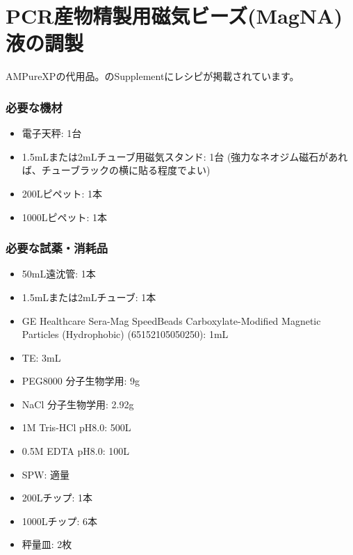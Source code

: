 \documentclass[titlepage,10pt,a4paper,uplatex]{jsbook}
\begin{document}
\section{PCR産物精製用磁気ビーズ(MagNA)液の調製}\label{makingMagNA}

AMPureXPの代用品。\citet{Rohland2012}のSupplementにレシピが掲載されています。

\subsubsection{必要な機材}
\begin{itemize}
\item 電子天秤: 1台
\item 1.5mLまたは2mLチューブ用磁気スタンド: 1台 (強力なネオジム磁石があれば、チューブラックの横に貼る程度でよい)
\item 200{\textmu}Lピペット: 1本
\item 1000{\textmu}Lピペット: 1本
\end{itemize}

\subsubsection{必要な試薬・消耗品}
\begin{itemize}
\item 50mL遠沈管: 1本
\item 1.5mLまたは2mLチューブ: 1本
\item GE Healthcare Sera-Mag SpeedBeads Carboxylate-Modified Magnetic Particles (Hydrophobic) (65152105050250): 1mL
\item TE: 3mL
\item PEG8000 分子生物学用: 9g
\item NaCl 分子生物学用: 2.92g
\item 1M Tris-HCl pH8.0: 500{\textmu}L
\item 0.5M EDTA pH8.0: 100{\textmu}L
\item SPW: 適量
\item 200{\textmu}Lチップ: 1本
\item 1000{\textmu}Lチップ: 6本
\item 秤量皿: 2枚
\end{itemize}
\end{document}
